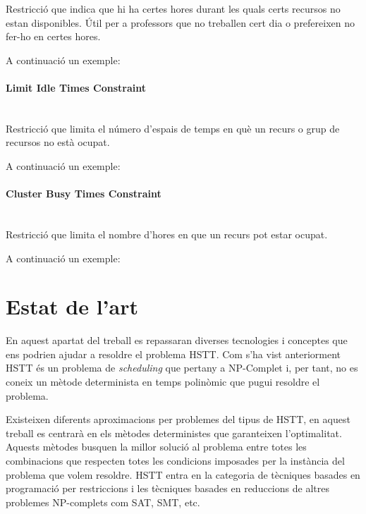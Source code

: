 \documentclass[11pt,a4paper,twoside]{report}
\begin{document}
  Restricció que indica que hi ha certes hores durant les quals certs recursos no estan disponibles. Útil per a professors que no treballen cert dia o prefereixen no fer-ho en certes hores.
  
  A continuació un exemple:

  
  
  \paragraph*{Limit Idle Times Constraint} ~\\

  Restricció que limita el número d'espais de temps en què un recurs o grup de recursos no està ocupat. 

  A continuació un exemple:

  
  \paragraph*{Cluster Busy Times Constraint} ~\\

  Restricció que limita el nombre d'hores en que un recurs pot estar ocupat.

  A continuació un exemple:

  


  

  \section{Estat de l'art}

  En aquest apartat del treball es repassaran diverses tecnologies i conceptes que ens podrien ajudar a resoldre el problema HSTT. 
  Com s'ha vist anteriorment HSTT és un problema de \textit{scheduling} que pertany a NP-Complet i, per tant, no es coneix un mètode determinista en temps polinòmic que pugui resoldre el problema. 

  Existeixen diferents aproximacions per problemes del tipus de HSTT, en aquest treball es centrarà en els mètodes deterministes que garanteixen l'optimalitat. Aquests mètodes busquen la millor solució al problema entre totes les combinacions 
  que respecten totes les condicions imposades per la instància del problema que volem resoldre. HSTT entra en la categoria de tècniques basades en programació per restriccions i les tècniques basades en reduccions de altres problemes NP-complets com SAT, SMT, etc.
\end{document}
